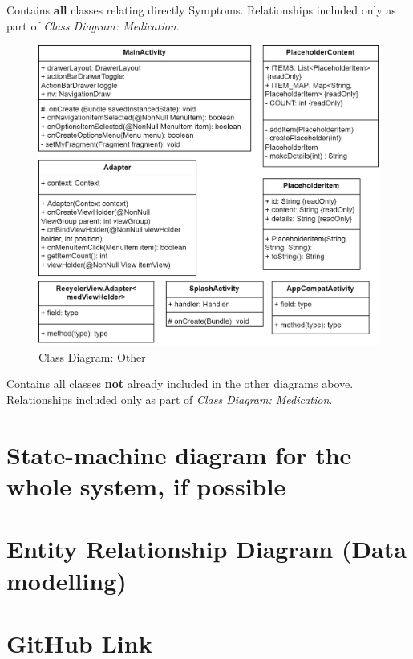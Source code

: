 \documentclass[11pt]{article}
\begin{document}
    Contains \textbf{all} classes relating directly Symptoms.
    Relationships included only as part of \textit{Class Diagram: Medication}.

    \begin{figure}[H]
        \centering
        \includegraphics[width=\textwidth]{Diagrams/Class Diagrams/Class Diagram-Other Classes}
        \caption{Class Diagram: Other}
        \label{fig:figure4}
    \end{figure}

    Contains all classes \textbf{not} already included in the other diagrams above.
    Relationships included only as part of \textit{Class Diagram: Medication}.




    \section{State-machine diagram {for the whole system, if possible}}\label{sec:state-machine-diagram}


    \section{Entity Relationship Diagram (Data modelling)}\label{sec:er--diagram-(data-modelling)}


    \section{GitHub Link}\label{sec:github-link}
\end{document}

